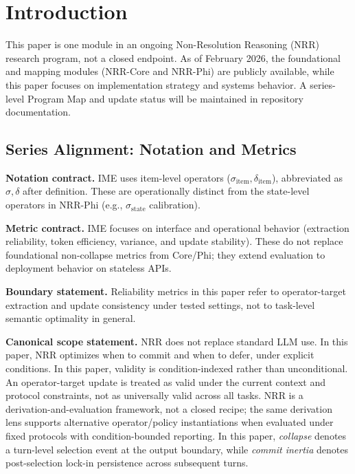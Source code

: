 \documentclass[11pt,a4paper]{article}
\begin{document}
\section{Introduction}
\label{sec:intro}

This paper is one module in an ongoing Non-Resolution Reasoning (NRR) research program, not a closed endpoint. As of February 2026, the foundational and mapping modules (NRR-Core and NRR-Phi) are publicly available, while this paper focuses on implementation strategy and systems behavior. A series-level Program Map and update status will be maintained in repository documentation.

\subsection{Series Alignment: Notation and Metrics}

\textbf{Notation contract.} IME uses item-level operators
($\sigma_{\text{item}}, \delta_{\text{item}}$), abbreviated as $\sigma,\delta$
after definition. These are operationally distinct from the state-level
operators in NRR-Phi (e.g., $\sigma_{\mathrm{state}}$ calibration).

\textbf{Metric contract.} IME focuses on interface and operational behavior
(extraction reliability, token efficiency, variance, and update stability).
These do not replace foundational non-collapse metrics from Core/Phi; they
extend evaluation to deployment behavior on stateless APIs.

\textbf{Boundary statement.} Reliability metrics in this paper refer to
operator-target extraction and update consistency under tested settings, not to
task-level semantic optimality in general.

\textbf{Canonical scope statement.} NRR does not replace standard LLM use.
In this paper, NRR optimizes when to commit and when to defer, under explicit conditions.
In this paper, validity is condition-indexed rather than unconditional.
An operator-target update is treated as valid under the current context and protocol constraints, not as universally valid across all tasks.
NRR is a derivation-and-evaluation framework, not a closed recipe; the same derivation lens supports alternative operator/policy instantiations when evaluated under fixed protocols with condition-bounded reporting.
In this paper, \emph{collapse} denotes a turn-level selection event at the output boundary, while \emph{commit inertia} denotes post-selection lock-in persistence across subsequent turns.
\end{document}
